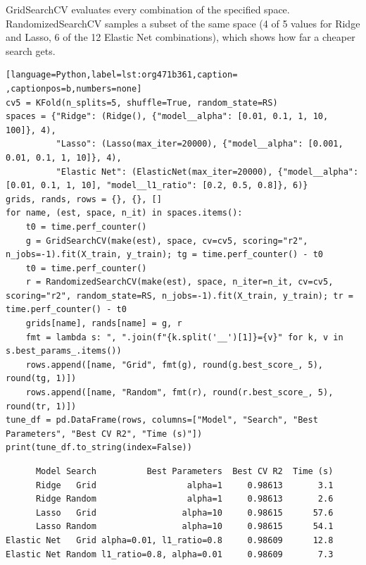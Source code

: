 \documentclass[11pt]{article}
\begin{document}
GridSearchCV evaluates every combination of the specified space. RandomizedSearchCV samples
a subset of the same space (4 of 5 values for Ridge and Lasso, 6 of the 12 Elastic Net
combinations), which shows how far a cheaper search gets.
\begin{lstlisting}[language=Python,label=lst:org471b361,caption= ,captionpos=b,numbers=none]
cv5 = KFold(n_splits=5, shuffle=True, random_state=RS)
spaces = {"Ridge": (Ridge(), {"model__alpha": [0.01, 0.1, 1, 10, 100]}, 4),
          "Lasso": (Lasso(max_iter=20000), {"model__alpha": [0.001, 0.01, 0.1, 1, 10]}, 4),
          "Elastic Net": (ElasticNet(max_iter=20000), {"model__alpha": [0.01, 0.1, 1, 10], "model__l1_ratio": [0.2, 0.5, 0.8]}, 6)}
grids, rands, rows = {}, {}, []
for name, (est, space, n_it) in spaces.items():
    t0 = time.perf_counter()
    g = GridSearchCV(make(est), space, cv=cv5, scoring="r2", n_jobs=-1).fit(X_train, y_train); tg = time.perf_counter() - t0
    t0 = time.perf_counter()
    r = RandomizedSearchCV(make(est), space, n_iter=n_it, cv=cv5, scoring="r2", random_state=RS, n_jobs=-1).fit(X_train, y_train); tr = time.perf_counter() - t0
    grids[name], rands[name] = g, r
    fmt = lambda s: ", ".join(f"{k.split('__')[1]}={v}" for k, v in s.best_params_.items())
    rows.append([name, "Grid", fmt(g), round(g.best_score_, 5), round(tg, 1)])
    rows.append([name, "Random", fmt(r), round(r.best_score_, 5), round(tr, 1)])
tune_df = pd.DataFrame(rows, columns=["Model", "Search", "Best Parameters", "Best CV R2", "Time (s)"])
print(tune_df.to_string(index=False))
\end{lstlisting}

\begin{verbatim}
      Model Search          Best Parameters  Best CV R2  Time (s)
      Ridge   Grid                  alpha=1     0.98613       3.1
      Ridge Random                  alpha=1     0.98613       2.6
      Lasso   Grid                 alpha=10     0.98615      57.6
      Lasso Random                 alpha=10     0.98615      54.1
Elastic Net   Grid alpha=0.01, l1_ratio=0.8     0.98609      12.8
Elastic Net Random l1_ratio=0.8, alpha=0.01     0.98609       7.3
\end{verbatim}
\end{document}

